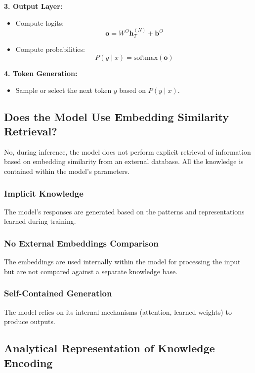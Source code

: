 \documentclass[12pt]{article}
\begin{document}
\textbf{3. Output Layer:}

\begin{itemize}
    \item Compute logits:
    \[
    \mathbf{o} = W^O \mathbf{h}_T^{(N)} + \mathbf{b}^O
    \]
    \item Compute probabilities:
    \[
    P(y \mid x) = \text{softmax}(\mathbf{o})
    \]
\end{itemize}

\textbf{4. Token Generation:}

\begin{itemize}
    \item Sample or select the next token \( y \) based on \( P(y \mid x) \).
\end{itemize}

\subsection{Does the Model Use Embedding Similarity Retrieval?}

No, during inference, the model does not perform explicit retrieval of information based on embedding similarity from an external database. All the knowledge is contained within the model's parameters.

\subsubsection{Implicit Knowledge}

The model's responses are generated based on the patterns and representations learned during training.

\subsubsection{No External Embeddings Comparison}

The embeddings are used internally within the model for processing the input but are not compared against a separate knowledge base.

\subsubsection{Self-Contained Generation}

The model relies on its internal mechanisms (attention, learned weights) to produce outputs.

\subsection{Analytical Representation of Knowledge Encoding}
\end{document}

